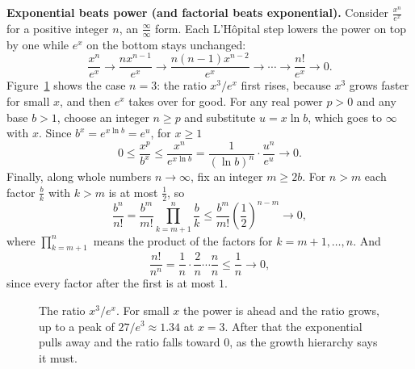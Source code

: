 \begin{focusbox}
\textbf{Exponential beats power (and factorial beats exponential).} Consider
$\tfrac{x^n}{e^x}$ for a positive integer $n$, an $\tfrac{\infty}{\infty}$ form. Each
L'H\^opital step lowers the power on top by one while $e^x$ on the bottom stays
unchanged:
\[
\frac{x^n}{e^x}\to\frac{n x^{n-1}}{e^x}\to\frac{n(n-1)x^{n-2}}{e^x}\to\cdots
\to\frac{n!}{e^x}\to 0.
\]
Figure~\ref{ch18:fig-power-exp} shows the case $n=3$: the ratio $x^3/e^x$ first
rises, because $x^3$ grows faster for small $x$, and then $e^x$ takes over for good.
For any real power $p>0$ and any base $b>1$, choose an integer $n\ge p$ and substitute
$u = x\ln b$, which goes to $\infty$ with $x$. Since $b^x=e^{x\ln b}=e^u$, for $x\ge 1$
\[
0 \le \frac{x^p}{b^x} \le \frac{x^n}{e^{x\ln b}} = \frac{1}{(\ln b)^{n}}\cdot\frac{u^n}{e^u}\to 0.
\]
Finally, along whole numbers $n\to\infty$, fix an integer
$m\ge 2b$. For $n>m$ each factor $\tfrac{b}{k}$ with $k>m$ is at most $\tfrac12$, so
\[
\frac{b^n}{n!} = \frac{b^m}{m!}\prod_{k=m+1}^{n}\frac{b}{k} \le \frac{b^m}{m!}\left(\frac12\right)^{n-m}\to 0,
\]
where $\prod_{k=m+1}^{n}$ means the product of the factors for $k=m+1,\dots,n$. And
\[
\frac{n!}{n^n} = \frac{1}{n}\cdot\frac{2}{n}\cdots\frac{n}{n}\le \frac{1}{n}\to 0,
\]
since every factor after the first is at most $1$.
\end{focusbox}

\begin{figure}[htbp]
\centering
{}
\caption{The ratio $x^3/e^x$. For small $x$ the power is ahead and the ratio grows,
up to a peak of $27/e^3\approx 1.34$ at $x=3$. After that the exponential pulls away and
the ratio falls toward $0$, as the growth hierarchy says it must.}
\label{ch18:fig-power-exp}
\end{figure}

